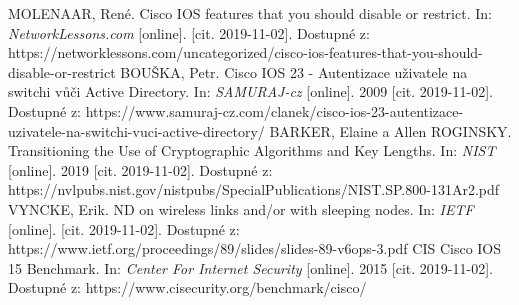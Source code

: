 \begin{literatura}{99}
MOLENAAR, René. Cisco IOS features that you should disable or restrict. In: \textit{NetworkLessons.com} [online]. [cit. 2019-11-02]. Dostupné z: https://networklessons.com/uncategorized/cisco-ios-features-that-you-should-disable-or-restrict
BOUŠKA, Petr. Cisco IOS 23 - Autentizace uživatele na switchi vůči Active Directory. In: \textit{SAMURAJ-cz} [online]. 2009 [cit. 2019-11-02]. Dostupné z: https://www.samuraj-cz.com/clanek/cisco-ios-23-autentizace-uzivatele-na-switchi-vuci-active-directory/
BARKER, Elaine a Allen ROGINSKY. Transitioning the Use of Cryptographic Algorithms and Key Lengths. In: \textit{NIST} [online]. 2019 [cit. 2019-11-02]. Dostupné z: https://nvlpubs.nist.gov/nistpubs/SpecialPublications/NIST.SP.800-131Ar2.pdf
VYNCKE, Erik. ND on wireless links and/or with sleeping nodes. In: \textit{IETF} [online]. [cit. 2019-11-02]. Dostupné z: https://www.ietf.org/proceedings/89/slides/slides-89-v6ops-3.pdf
CIS Cisco IOS 15 Benchmark. In: \textit{Center For Internet Security} [online]. 2015 [cit. 2019-11-02]. Dostupné z: https://www.cisecurity.org/benchmark/cisco/


\end{literatura}
